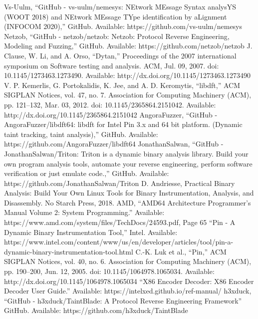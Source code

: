 \documentclass[conference]{IEEEtran}
\begin{document}
\begin{thebibliography}{00}
     Vs-Uulm, “GitHub - vs-uulm/nemesys: NEtwork MEssage Syntax analysYS (WOOT 2018) and NEtwork MEssage TYpe identification by aLignment (INFOCOM 2020),” GitHub. Available: https://github.com/vs-uulm/nemesys
     Netzob, “GitHub - netzob/netzob: Netzob: Protocol Reverse Engineering, Modeling and Fuzzing,” GitHub. Available: https://github.com/netzob/netzob
     J. Clause, W. Li, and A. Orso, “Dytan,” Proceedings of the 2007 international symposium on Software testing and analysis. ACM, Jul. 09, 2007. doi: 10.1145/1273463.1273490. Available: http://dx.doi.org/10.1145/1273463.1273490
     V. P. Kemerlis, G. Portokalidis, K. Jee, and A. D. Keromytis, “libdft,” ACM SIGPLAN Notices, vol. 47, no. 7. Association for Computing Machinery (ACM), pp. 121–132, Mar. 03, 2012. doi: 10.1145/2365864.2151042. Available: http://dx.doi.org/10.1145/2365864.2151042
     AngoraFuzzer, “GitHub - AngoraFuzzer/libdft64: libdft for Intel Pin 3.x and 64 bit platform. (Dynamic taint tracking, taint analysis),” GitHub. Available: https://github.com/AngoraFuzzer/libdft64
     JonathanSalwan, “GitHub - JonathanSalwan/Triton: Triton is a dynamic binary analysis library. Build your own program analysis tools, automate your reverse engineering, perform software verification or just emulate code.,” GitHub. Available: https://github.com/JonathanSalwan/Triton
     D. Andriesse, Practical Binary Analysis: Build Your Own Linux Tools for Binary Instrumentation, Analysis, and Disassembly. No Starch Press, 2018.
     AMD, “AMD64 Architecture Programmer’s Manual Volume 2: System Programming.” Available: https://www.amd.com/system/files/TechDocs/24593.pdf, Page 65
     “Pin - A Dynamic Binary Instrumentation Tool,” Intel. Available: https://www.intel.com/content/www/us/en/developer/articles/tool/pin-a-dynamic-binary-instrumentation-tool.html
     C.-K. Luk et al., “Pin,” ACM SIGPLAN Notices, vol. 40, no. 6. Association for Computing Machinery (ACM), pp. 190–200, Jun. 12, 2005. doi: 10.1145/1064978.1065034. Available: http://dx.doi.org/10.1145/1064978.1065034
     “X86 Encoder Decoder: X86 Encoder Decoder User Guide.” Available: https://intelxed.github.io/ref-manual/
     h3xduck, “GitHub - h3xduck/TaintBlade: A Protocol Reverse Engineering Framework” GitHub. Available: https://github.com/h3xduck/TaintBlade

\end{thebibliography}
\end{document}

